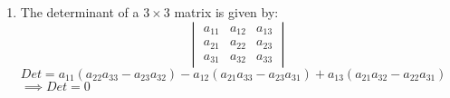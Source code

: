 \renewcommand{\theequation}{\theenumi}
\begin{enumerate}[label=\arabic*.,ref=\thesubsubsection.\theenumi]
%
\item The determinant of a $3\times3$ matrix is given by:
$$
\begin{vmatrix}
a_{11}&a_{12}&a_{13}\\a_{21}&a_{22}&a_{23}\\a_{31}&a_{32}&a_{33}
\end{vmatrix}
$$
$ Det = a_{11}(a_{22}a_{33}-a_{23}a_{32})-a_{12}(a_{21}a_{33}-a_{23}a_{31})+a_{13}(a_{21}a_{32}-a_{22}a_{31})$ \\
$\implies Det = 0$
\end{enumerate}